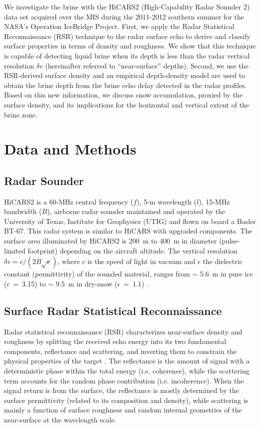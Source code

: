 \documentclass[draft,grl]{agutex}
\begin{document}
\begin{article}
We investigate the brine with the HiCARS2 (High-Capability Radar Sounder 2) data set acquired over the MIS during the 2011-2012 southern summer for the NASA's Operation IceBridge Project. First, we apply the Radar Statistical Reconnaissance (RSR) technique \citep{Grima-2014-ID865} to the radar surface echo to derive and classify surface properties in terms of density and roughness. We show that this technique is capable of detecting liquid brine when its depth is less than the radar vertical resolution $\delta v$ (hereinafter referred to “near-surface” depths). Second, we use the RSR-derived surface density and an empirical depth-density model are used to obtain the brine depth from the brine echo delay detected in the radar profiles. Based on this new information, we discuss snow accumulation, proxied by the surface density, and its implications for the horizontal and vertical extent of the brine zone.


\section{Data and Methods}

\subsection{Radar Sounder}
HiCARS2 is a 60-MHz central frequency ($f$), 5-m wavelength ($l$), 15-MHz bandwidth ($B$), airborne radar sounder maintained and operated by the University of Texas, Institute for Geophysics (UTIG) and flown on board a Basler BT-67. This radar system is similar to HiCARS \citep{Peters-2005-ID553} with upgraded components. The surface area illuminated by HiCARS2 is 200~m to 400~m in diameter (pulse-limited footprint) depending on the aircraft altitude. The vertical resolution $\delta v=c/(2B\sqrt{\epsilon})$, where $c$ is the speed of light in vacuum and $\epsilon$ the dielectric constant (permittivity) of the sounded material, ranges from $\sim$ 5.6~m in pure ice ($\epsilon$~=~3.15) to $\sim$ 9.5~m in dry-snow ($\epsilon$~=~1.1) \citep{Kovacs-1995-ID697}.

\subsection{Surface Radar Statistical Reconnaissance}
Radar statistical reconnaissance (RSR) characterizes near-surface density and roughness by splitting the received echo energy into its two fundamental components, reflectance and scattering, and inverting them to constrain the physical properties of the target \citep{Grima-2012-ID254,Grima-2014-ID867,Grima-2014-ID865}. The reflectance is the amount of signal with a deterministic phase within the total energy (i.e. coherence), while the scattering term accounts for the random phase contribution (i.e. incoherence). When the signal return is from the surface, the reflectance is mostly determined by the surface permittivity (related to its composition and density), while scattering is mainly a function of surface roughness and random internal geometries of the near-surface at the wavelength scale.


\end{article}
\end{document}
